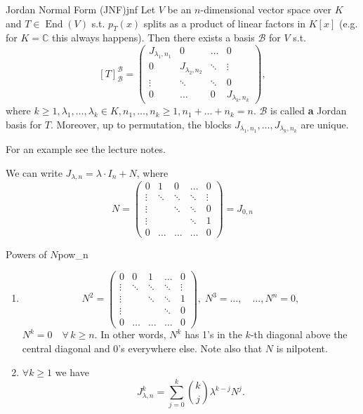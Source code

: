 \begin{theorem}{Jordan Normal Form (JNF)}{jnf}
	Let $V$ be an $n$-dimensional vector space over $K$ and $T \in \operatorname{End}(V)$ s.t. $p_T(x)$ splits as a product of linear factors in $K[x]$ (e.g. for $K = \mathbb{C}$ this always happens). Then there exists a basis $\mathcal{B}$ for $V$ s.t.
	\[
		[T]^{\mathcal{B}}_{\mathcal{B}} = 
		\begin{pmatrix}
			J_{\lambda_1, n_1} & 0 & \hdots & 0\\
			0 & J_{\lambda_2, n_2} & \ddots & \vdots\\
			\vdots & \ddots & \ddots & 0\\
			0 & \hdots & 0 & J_{\lambda_k, n_k}
		\end{pmatrix},
	\]
	where $k \geq 1, \lambda_1, \hdots , \lambda_k \in K, n_1, \hdots , n_k \geq 1, n_1 + \hdots + n_k = n$. $\mathcal{B}$ is called \textbf{a} Jordan basis for $T$.
	Moreover, up to permutation, the blocks $J_{\lambda_1, n_1}, \hdots , J_{\lambda_k, n_k}$ are unique.
\end{theorem}
For an example see the lecture notes.

We can write $J_{\lambda, n} = \lambda \cdot I_n + N$, where
\[
	N = 
	\begin{pmatrix}
		0 & 1 & 0 & \hdots & 0\\
		\vdots & \ddots & \ddots & \ddots & \vdots\\
		\vdots & & \ddots & \ddots & 0\\
		\vdots &  & & \ddots & 1\\
		0 & \hdots & \hdots & \hdots & 0  
	\end{pmatrix} = J_{0, n}
\]

\begin{lemma}{Powers of $N$}{pow_n}
	\begin{enumerate}
		\item 
		\[
			N^2 = 
			\begin{pmatrix}
				0 & 0 & 1 & \hdots & 0\\
				\vdots & \ddots & \ddots & \ddots & \vdots\\
				\vdots & & \ddots & \ddots & 1\\
				\vdots &  & & \ddots & 0\\
				0 & \hdots & \hdots & \hdots & 0 
			\end{pmatrix}, \; N^3 = \hdots, \quad  \hdots, N^n = 0,
		\]
		$N^k = 0 \quad \forall \, k \geq n$. In other words, $N^k$ has 1's in the $k$-th diagonal above the central diagonal and 0's everywhere else. Note also that $N$ is nilpotent.
		\item $\forall k \geq 1$ we have
		\[
			J_{\lambda, n}^k = \sum_{j=0}^{k} \binom{k}{j} \lambda^{k - j} N^j.
		\]
	\end{enumerate}
\end{lemma}

